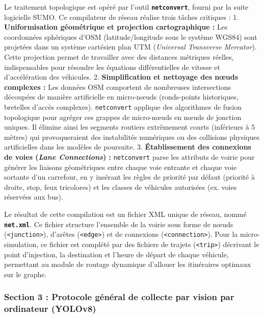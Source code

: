 \documentclass[10pt, a4paper]{article}
\begin{document}
Le traitement topologique est opéré par l'outil
\textbf{\texttt{netconvert}}, fourni par la suite logicielle SUMO. Ce
compilateur de réseau réalise trois tâches critiques : 1.
\textbf{Uniformisation géométrique et projection cartographique :} Les
coordonnées sphériques d'OSM (latitude/longitude sous le système WGS84)
sont projetées dans un système cartésien plan UTM (\emph{Universal
Transverse Mercator}). Cette projection permet de travailler avec des
distances métriques réelles, indispensables pour résoudre les équations
différentielles de vitesse et d'accélération des véhicules. 2.
\textbf{Simplification et nettoyage des nœuds complexes :} Les données
OSM comportent de nombreuses intersections découpées de manière
artificielle en micro-nœuds (ronds-points historiques, bretelles d'accès
complexes). \texttt{netconvert} applique des algorithmes de fusion
topologique pour agréger ces grappes de micro-nœuds en nœuds de jonction
uniques. Il élimine ainsi les segments routiers extrêmement courts
(inférieurs à 5 mètres) qui provoqueraient des instabilités numériques
ou des collisions physiques artificielles dans les modèles de poursuite.
3. \textbf{Établissement des connexions de voies (\emph{Lane
Connections}) :} \texttt{netconvert} parse les attributs de voirie pour
générer les liaisons géométriques entre chaque voie entrante et chaque
voie sortante d'un carrefour, en y insérant les règles de priorité par
défaut (priorité à droite, stop, feux tricolores) et les classes de
véhicules autorisées (ex. voies réservées aux bus).

Le résultat de cette compilation est un fichier XML unique de réseau,
nommé \textbf{\texttt{net.xml}}. Ce fichier structure l'ensemble de la
voirie sous forme de nœuds (\texttt{\textless{}junction\textgreater{}}),
d'arêtes (\texttt{\textless{}edge\textgreater{}}) et de connexions
(\texttt{\textless{}connection\textgreater{}}). Pour la
micro-simulation, ce fichier est complété par des fichiers de trajets
(\texttt{\textless{}trip\textgreater{}}) décrivant le point d'injection,
la destination et l'heure de départ de chaque véhicule, permettant au
module de routage dynamique d'allouer les itinéraires optimaux sur le
graphe.

\subsubsection{Section 3 : Protocole général de collecte par vision par
ordinateur
(YOLOv8)}\label{section-3-protocole-guxe9nuxe9ral-de-collecte-par-vision-par-ordinateur-yolov8}
\end{document}
